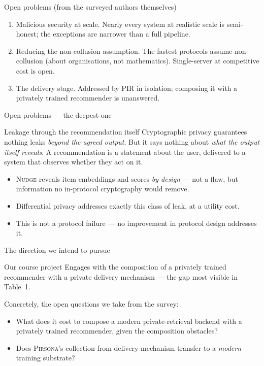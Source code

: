 \documentclass[10pt,aspectratio=169]{beamer}
\newcommand{\sys}[1]{\textsc{#1}\xspace}
\begin{document}
\begin{frame}{Open problems (from the surveyed authors themselves)}
  \begin{enumerate}
    \item \alert{Malicious security at scale.} Nearly every system at realistic scale is
          semi-honest; the exceptions are narrower than a full pipeline.
    \item \alert{Reducing the non-collusion assumption.} The fastest protocols assume
          non-collusion (about organisations, not mathematics). Single-server at
          competitive cost is open.
    \item \alert{The delivery stage.} Addressed by PIR in isolation; composing it with a
          privately trained recommender is unanswered.
  \end{enumerate}
\end{frame}
 
\begin{frame}{Open problems --- the deepest one}
  \begin{block}{Leakage through the recommendation itself}
    Cryptographic privacy guarantees nothing leaks \emph{beyond the agreed output}.
    But it says nothing about \emph{what the output itself reveals}.
    A recommendation is a statement about the user, delivered to a system that
    observes whether they act on it.
  \end{block}
 
  \begin{itemize}
    \item \sys{Nudge} reveals item embeddings and scores \emph{by design} --- not a flaw,
          but information no in-protocol cryptography would remove.
    \item Differential privacy addresses exactly this class of leak, at a utility cost.
    \item \alert{This is not a protocol failure} --- no improvement in protocol design
          addresses it.
  \end{itemize}
\end{frame}
 
\begin{frame}{The direction we intend to pursue}
  \begin{block}{Our course project}
    Engages with the \alert{composition of a privately trained recommender with a
    private delivery mechanism} --- the gap most visible in Table~1.
  \end{block}
 
  Concretely, the open questions we take from the survey:
  \begin{itemize}
    \item What does it cost to compose a modern private-retrieval backend with a
          privately trained recommender, given the composition obstacles?
    \item Does \sys{Pirsona}'s collection-from-delivery mechanism transfer to a
          \emph{modern} training substrate?
  \end{itemize}
\end{frame}
 
\end{document}
